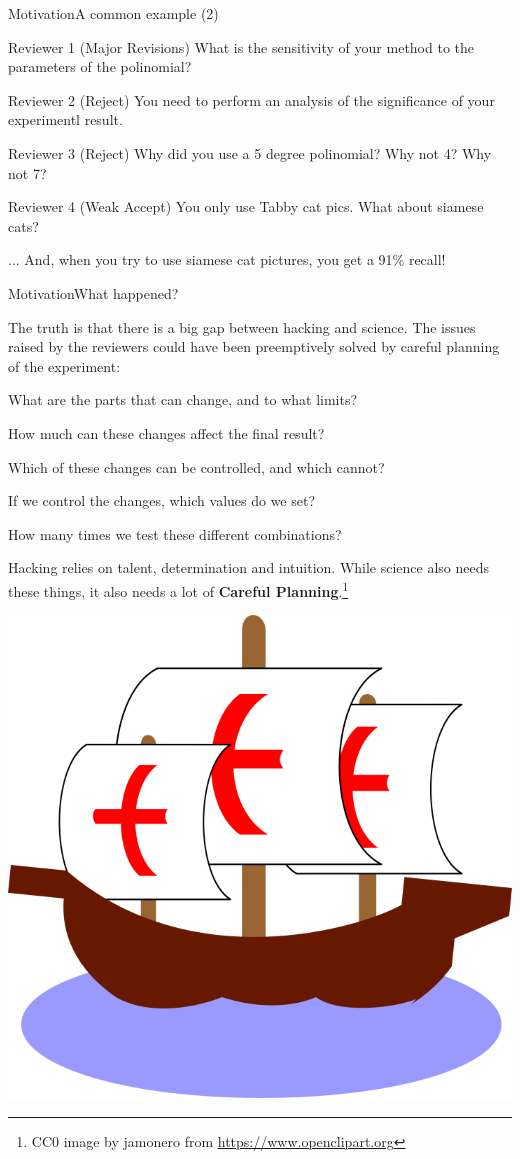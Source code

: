 \documentclass[t]{beamer}
\begin{document}
\begin{ftst}
  {Motivation}{A common example (2)}

  {\small
    \begin{block}{Reviewer 1 (Major Revisions)}
      What is the sensitivity of your method to the parameters of the
      polinomial?
    \end{block}
    \begin{alertblock}{Reviewer 2 (Reject)}
      You need to perform an analysis of the significance of your
      experimentl result.
    \end{alertblock}
    \begin{alertblock}{Reviewer 3 (Reject)}
      Why did you use a 5 degree polinomial? Why not 4? Why not 7?
    \end{alertblock}
    \begin{exampleblock}{Reviewer 4 (Weak Accept)}
      You only use Tabby cat pics. What about siamese cats?
    \end{exampleblock}
    ... And, when you try to use siamese cat pictures, you get a 91\%
    recall!  }
\end{ftst}

\begin{ftst}
  {Motivation}{What happened?}

  The truth is that there is a big gap between hacking and
  science. The issues raised by the reviewers could have been
  preemptively solved by careful planning of the experiment:
  
  \vone

  \bitems What are the parts that can change, and to what limits?
\item How much can these changes affect the final result?
\item Which of these changes can be controlled, and which cannot?
\item If we control the changes, which values do we set?
\item How many times we test these different combinations?
  \eitem
  
  \vone
  
  Hacking relies on talent, determination and intuition. While science
  also needs these things, it also needs a lot of {\bf Careful
    Planning}.\footnote{CC0 image by jamonero from
    \url{https://www.openclipart.org}}

  \hfill\includegraphics[width=.13\textwidth]{../../../figs/caravela}    
\end{ftst}
\end{document}
